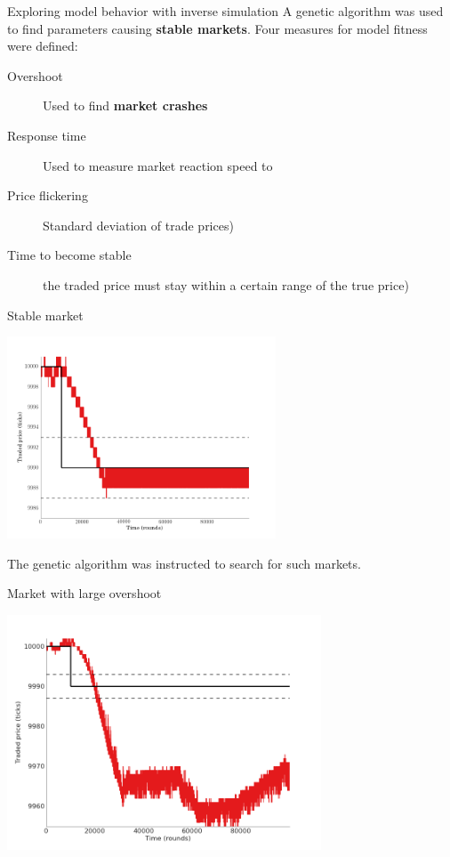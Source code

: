 \documentclass[14pt]{beamer}
\begin{document}
\begin{frame}{Exploring model behavior with inverse simulation}
A genetic algorithm was used to find parameters causing \textbf{stable markets}. Four measures for model fitness were defined:
\begin{small}
\begin{description}
\item[Overshoot] Used to find \textbf{market crashes}
\item[Response time] Used to measure market reaction speed to 
\item[Price flickering] Standard deviation of trade prices)
\item[Time to become stable] the traded price must stay within a certain range of the true price)
\end{description}
\end{small}
\end{frame}

\begin{frame}{Stable market}
\begin{center}
\includegraphics[width=0.6\textwidth]{market_cases/a_stable_within_margin.png}
\end{center}
The genetic algorithm was instructed to search for such markets.
\end{frame}

 
\begin{frame}{Market with large overshoot}
\begin{center}
\includegraphics[width=0.7\textwidth]{market_cases/f_crash.png}
\end{center}
\end{frame}
\end{document}
